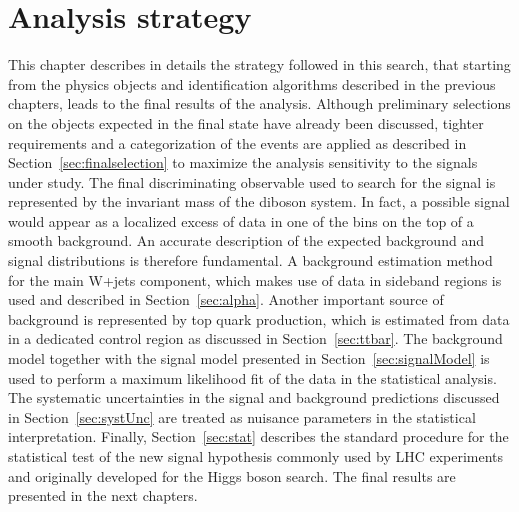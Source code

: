 \chapter{Analysis strategy}\label{ch:strategy}

This chapter describes in details the strategy followed in this search, that starting from the physics objects and identification algorithms described in the previous chapters, leads to the final results of the analysis.
Although preliminary selections on the objects expected in the final state have already been discussed, tighter requirements and a categorization of the events are applied as described in Section~\ref{sec:finalselection} to maximize the analysis sensitivity to the signals under study. The final discriminating observable used to search for the signal is represented by the invariant mass of the diboson system. In fact, a possible signal would appear as a localized excess of data in one of the bins on the top of a smooth background. An accurate description of the expected background and signal distributions is therefore fundamental. A background estimation method for the main W+jets component, which makes use of data in sideband regions is used and described in Section~\ref{sec:alpha}. Another important source of background is represented by top quark production, which is estimated from data in a dedicated control region as discussed in Section~\ref{sec:ttbar}. The background model together with the signal model presented in Section~\ref{sec:signalModel} is used to perform a maximum likelihood fit of the data in the statistical analysis.
The systematic uncertainties in the signal and background predictions discussed in Section~\ref{sec:systUnc} are treated as nuisance parameters in the statistical interpretation.
Finally, Section~\ref{sec:stat} describes the standard procedure for the statistical test of the new signal hypothesis commonly used by LHC experiments and originally developed for the Higgs boson search.
The final results are presented in the next chapters.

 
  
 
 
